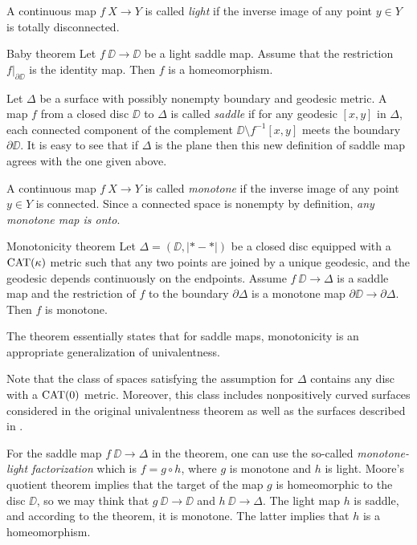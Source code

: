 \documentclass{article}
\begin{document}
A continuous map $f\:X\to Y$ is called \emph{light} if the inverse image of any point $y\in Y$ is totally disconnected.

\begin{thm}{Baby theorem}\label{baby}
Let $f\:\DD\to \DD$ be a light saddle map.
Assume that 
the restriction $f|_{\partial\DD}$ is the identity map.
Then $f$ is a homeomorphism.
\end{thm}

Let $\Delta$ be a surface with possibly nonempty boundary and geodesic metric.
A map $f$ from a closed disc $\DD$ to $\Delta$ is called \emph{saddle} 
if for any geodesic $[x,y]$ in $\Delta$, each connected component of the complement $\DD\setminus f^{-1}[x,y]$ meets the boundary~$\partial\DD$.
It is easy to see that if $\Delta$ is the plane then this new definition of saddle map agrees with the one given above.

A continuous map $f\:X\to Y$ is called \emph{monotone} if the inverse image of any point $y\in Y$ is connected.
Since a connected space is nonempty by definition, \textit{any monotone map is onto}.

\begin{thm}{Monotonicity theorem}\label{thm:main}
Let $\Delta=(\DD,|{*}-{*}|)$ be a closed disc equipped with a $\mathop{\rm CAT}\nolimits(\kappa)$ metric 
such that any two points are joined by a unique geodesic, and the geodesic depends continuously on the endpoints.
Assume $f\:\DD\to \Delta$ is a saddle map and the restriction of $f$ to the boundary $\partial\Delta$ is a monotone map 
$\partial\DD\to\partial\Delta$.
Then $f$ is monotone. 
\end{thm}

The theorem essentially states that for saddle maps, monotonicity is an appropriate generalization of univalentness.

Note that the class of spaces satisfying the assumption for $\Delta$ contains any disc with a $\mathop{\rm CAT}\nolimits(0)$ metric.
Moreover, this class includes nonpositively curved surfaces considered in the original univalentness theorem \cite{schoen-yau}
as well as the surfaces described in \cite{jost}.

For the saddle map $f\:\DD\to \Delta$ in the theorem,
one can use the so-called \emph{monotone-light factorization} \cite{eilenberg}
which is $f=g\circ h$,
where $g$ is monotone and $h$ is light.
Moore's quotient theorem \cite{moore} implies that the target of the map $g$ is homeomorphic to the disc $\DD$, so we may think that $g\:\DD\to \DD$ and $h\:\DD\to \Delta$.
The light map $h$ is saddle, and according to the theorem, it is monotone.
The latter implies that $h$ is a homeomorphism.
\end{document}
